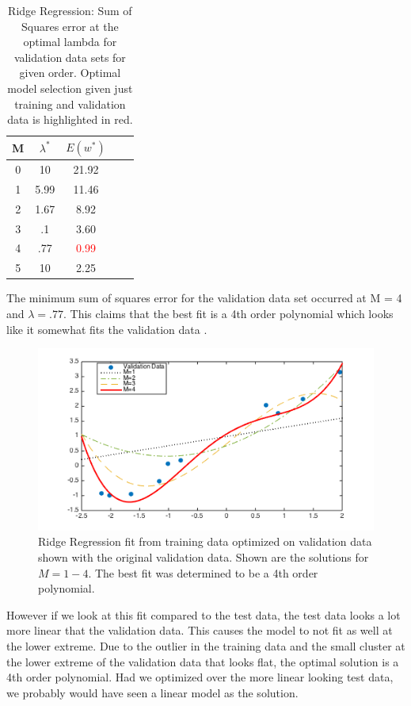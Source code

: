 \documentclass[10pt,twocolumn]{article}
\begin{document}
\begin{table}
\begin{center}
  \begin{tabular}{ | c | c | c | c | c | }
    \hline
     M & $\lambda ^*$  &$ E(w^*)$ \\ \hline
     0 & 10 & 21.92  \\ \hline
     1 & 5.99 & 11.46   \\ \hline
     2 &1.67 & 8.92   \\ \hline
     3 & .1 & 3.60   \\ \hline
     4 & .77 & \textcolor{red}{0.99}   \\ \hline
     5 & 10 & 2.25  \\ \hline    
    \hline
  \end{tabular}
  \caption{Ridge Regression:  Sum of Squares error at the optimal lambda for validation data sets for given order. Optimal model selection given just training and validation data is highlighted in red. }
\end{center}
\label{table:ave_sse}
\end{table}



The minimum sum of squares error for the validation data set occurred at M = 4 and $\lambda = .77$. This claims that the best fit is a 4th order polynomial which looks like it somewhat fits the validation data .
\begin{figure}[H]
\center
\includegraphics[scale =.5]{modelcomparison.png}
\caption{Ridge Regression fit from training data optimized on validation data shown with the original validation data. Shown are the solutions for $M=1-4$. The best fit was determined to be a 4th order polynomial.}
\end{figure}

However if we look at this fit compared to the test data, the test data looks a lot more linear that the validation data. This causes the model to not fit as well at the lower extreme.  Due to the outlier in the training data and the small cluster at the lower extreme of the validation data that looks flat, the optimal solution is a 4th order polynomial. Had we optimized over the more linear looking test data, we probably would have seen a linear model as the solution. 
\end{document}
